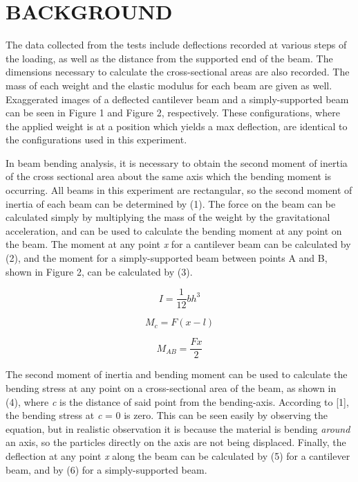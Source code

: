 \documentclass[12pt]{article}
\begin{document}
\section*{\fontsize{12}{12}\selectfont BACKGROUND}
The data collected from the tests include deflections recorded at various steps of the loading, as well as the distance from the supported end of the beam. The dimensions necessary to calculate the cross-sectional areas are also recorded. The mass of each weight and the elastic modulus for each beam are given as well.
Exaggerated images of a deflected cantilever beam and a simply-supported beam can be seen in Figure 1 and Figure 2, respectively. These configurations, where the applied weight is at a position which yields a max deflection, are identical to the configurations used in this experiment.
\bigskip

In beam bending analysis, it is necessary to obtain the second moment of inertia of the cross sectional area about the same axis which the bending moment is occurring. All beams in this experiment are rectangular, so the second moment of inertia of each beam can be determined by (1). The force on the beam can be calculated simply by multiplying the mass of the weight by the gravitational acceleration, and can be used to calculate the bending moment at any point on the beam. The moment at any point \emph{x} for a cantilever beam can be calculated by (2), and the moment for a simply-supported beam between points A and B, shown in Figure 2, can be calculated by (3).
\bigskip

\begin{equation}
I = \frac{1}{12}bh^3
\end{equation}

\bigskip
\begin{equation}
M_{c} = F(x-l)
\end{equation}

\bigskip
\begin{equation}
M_{AB} = \frac{Fx}{2}
\end{equation}
\bigskip

The second moment of inertia and bending moment can be used to calculate the bending stress at any point on a cross-sectional area of the beam, as shown in (4), where \emph{c} is the distance of said point from the bending-axis. According to [1], the bending stress at \emph{c} = 0 is zero. This can be seen easily by observing the equation, but in realistic observation it is because the material is bending \emph{around} an axis, so the particles directly on the axis are not being displaced. Finally, the deflection at any point \emph{x} along the beam can be calculated by (5) for a cantilever beam, and by (6) for a simply-supported beam.
\bigskip
\end{document}

